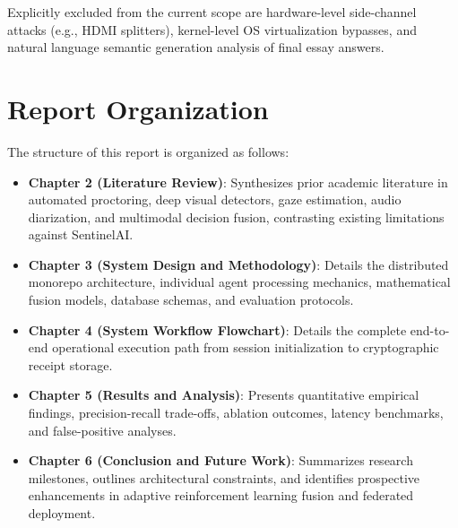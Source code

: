 Explicitly excluded from the current scope are hardware-level side-channel attacks (e.g., HDMI splitters), kernel-level OS virtualization bypasses, and natural language semantic generation analysis of final essay answers.

\section{Report Organization}

The structure of this report is organized as follows:
\begin{itemize}
    \item \textbf{Chapter 2 (Literature Review)}: Synthesizes prior academic literature in automated proctoring, deep visual detectors, gaze estimation, audio diarization, and multimodal decision fusion, contrasting existing limitations against SentinelAI.
    \item \textbf{Chapter 3 (System Design and Methodology)}: Details the distributed monorepo architecture, individual agent processing mechanics, mathematical fusion models, database schemas, and evaluation protocols.
    \item \textbf{Chapter 4 (System Workflow Flowchart)}: Details the complete end-to-end operational execution path from session initialization to cryptographic receipt storage.
    \item \textbf{Chapter 5 (Results and Analysis)}: Presents quantitative empirical findings, precision-recall trade-offs, ablation outcomes, latency benchmarks, and false-positive analyses.
    \item \textbf{Chapter 6 (Conclusion and Future Work)}: Summarizes research milestones, outlines architectural constraints, and identifies prospective enhancements in adaptive reinforcement learning fusion and federated deployment.
\end{itemize}
